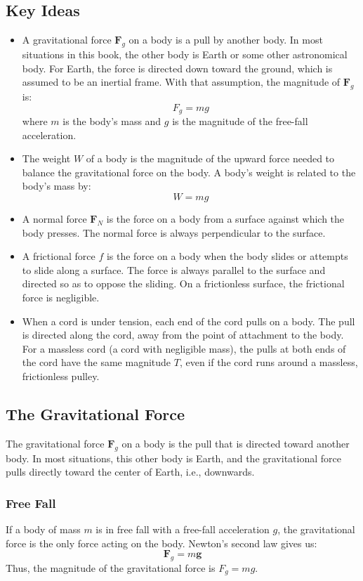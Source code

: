 \documentclass{article}
\begin{document}
\subsection*{Key Ideas}
\begin{itemize}
    \item A gravitational force $\mathbf{F}_g$ on a body is a pull by another body. In most situations in this book, the other body is Earth or some other astronomical body. For Earth, the force is directed down toward the ground, which is assumed to be an inertial frame. With that assumption, the magnitude of $\mathbf{F}_g$ is:
    \[
    F_g = mg
    \]
    where $m$ is the body’s mass and $g$ is the magnitude of the free-fall acceleration.
    \item The weight $W$ of a body is the magnitude of the upward force needed to balance the gravitational force on the body. A body’s weight is related to the body’s mass by:
    \[
    W = mg
    \]
    \item A normal force $\mathbf{F}_N$ is the force on a body from a surface against which the body presses. The normal force is always perpendicular to the surface.
    \item A frictional force $f$ is the force on a body when the body slides or attempts to slide along a surface. The force is always parallel to the surface and directed so as to oppose the sliding. On a frictionless surface, the frictional force is negligible.
    \item When a cord is under tension, each end of the cord pulls on a body. The pull is directed along the cord, away from the point of attachment to the body. For a massless cord (a cord with negligible mass), the pulls at both ends of the cord have the same magnitude $T$, even if the cord runs around a massless, frictionless pulley.
\end{itemize}

\subsection*{The Gravitational Force}
The gravitational force $\mathbf{F}_g$ on a body is the pull that is directed toward another body. In most situations, this other body is Earth, and the gravitational force pulls directly toward the center of Earth, i.e., downwards.

\subsubsection*{Free Fall}
If a body of mass $m$ is in free fall with a free-fall acceleration $g$, the gravitational force is the only force acting on the body. Newton's second law gives us:
\[
\mathbf{F}_g = m \mathbf{g}
\]
Thus, the magnitude of the gravitational force is $F_g = mg$.
\end{document}
